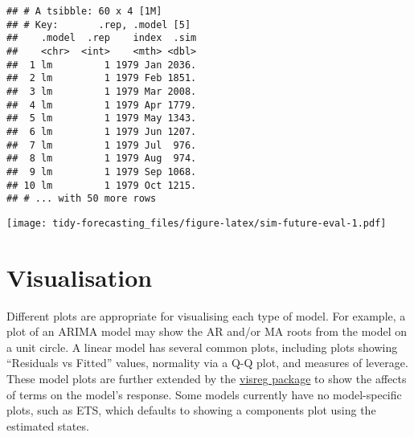 \documentclass[]{book}
\newenvironment{Shaded}{\begin{snugshade}}{\end{snugshade}}
\newcommand{\DataTypeTok}[1]{\textcolor[rgb]{0.13,0.29,0.53}{#1}}
\newcommand{\DecValTok}[1]{\textcolor[rgb]{0.00,0.00,0.81}{#1}}
\newcommand{\KeywordTok}[1]{\textcolor[rgb]{0.13,0.29,0.53}{\textbf{#1}}}
\newcommand{\NormalTok}[1]{#1}
\newcommand{\OperatorTok}[1]{\textcolor[rgb]{0.81,0.36,0.00}{\textbf{#1}}}
\newcommand{\StringTok}[1]{\textcolor[rgb]{0.31,0.60,0.02}{#1}}
\begin{document}
\begin{Shaded}
\end{Shaded}

\begin{verbatim}
## # A tsibble: 60 x 4 [1M]
## # Key:       .rep, .model [5]
##    .model  .rep    index  .sim
##    <chr>  <int>    <mth> <dbl>
##  1 lm         1 1979 Jan 2036.
##  2 lm         1 1979 Feb 1851.
##  3 lm         1 1979 Mar 2008.
##  4 lm         1 1979 Apr 1779.
##  5 lm         1 1979 May 1343.
##  6 lm         1 1979 Jun 1207.
##  7 lm         1 1979 Jul  976.
##  8 lm         1 1979 Aug  974.
##  9 lm         1 1979 Sep 1068.
## 10 lm         1 1979 Oct 1215.
## # ... with 50 more rows
\end{verbatim}

\texttt{[image: tidy-forecasting\_files/figure-latex/sim-future-eval-1.pdf]}

\hypertarget{visualisation}{%
\section{Visualisation}\label{visualisation}}

Different plots are appropriate for visualising each type of model. For example, a plot of an ARIMA model may show the AR and/or MA roots from the model on a unit circle. A linear model has several common plots, including plots showing ``Residuals vs Fitted'' values, normality via a Q-Q plot, and measures of leverage. These model plots are further extended by the \href{http://pbreheny.github.io/visreg/}{visreg package} to show the affects of terms on the model's response. Some models currently have no model-specific plots, such as ETS, which defaults to showing a components plot using the estimated states.
\end{document}
